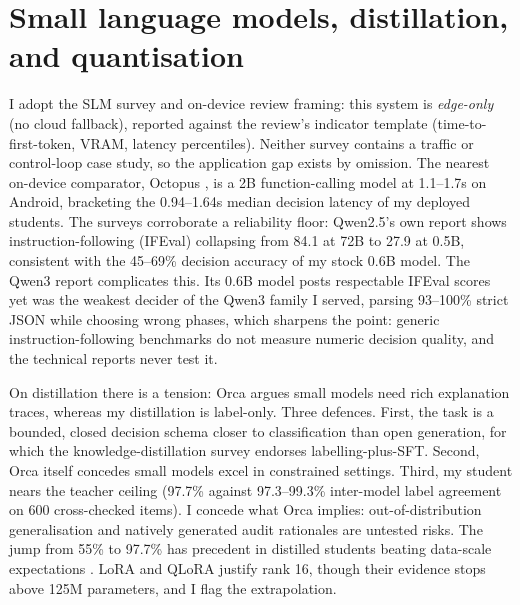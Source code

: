\section{Small language models, distillation, and quantisation}\label{sec:bg-slm}

I adopt the SLM survey \cite{slmsurvey2024} and on-device review \cite{ondevice2024} framing: this system is \emph{edge-only} (no cloud fallback), reported against the review's indicator template (time-to-first-token, VRAM, latency percentiles). Neither survey contains a traffic or control-loop case study, so the application gap exists by omission. The nearest on-device comparator, Octopus \cite{octopus2024}, is a 2B function-calling model at 1.1--1.7s on Android, bracketing the 0.94--1.64s median decision latency of my deployed students. The surveys corroborate a reliability floor: Qwen2.5's own report \cite{qwen25report} shows instruction-following (IFEval) collapsing from 84.1 at 72B to 27.9 at 0.5B, consistent with the 45--69\% decision accuracy of my stock 0.6B model. The Qwen3 report \cite{qwen3report} complicates this. Its 0.6B model posts respectable IFEval scores yet was the weakest decider of the Qwen3 family I served, parsing 93--100\% strict JSON while choosing wrong phases, which sharpens the point: generic instruction-following benchmarks do not measure numeric decision quality, and the technical reports never test it.

On distillation there is a tension: Orca \cite{mukherjee2023orca} argues small models need rich explanation traces, whereas my distillation is label-only. Three defences. First, the task is a bounded, closed decision schema closer to classification than open generation, for which the knowledge-distillation survey \cite{xu2024kdsurvey} endorses labelling-plus-SFT. Second, Orca itself concedes small models excel in constrained settings. Third, my student nears the teacher ceiling (97.7\% against 97.3--99.3\% inter-model label agreement on 600 cross-checked items). I concede what Orca implies: out-of-distribution generalisation and natively generated audit rationales are untested risks. The jump from 55\% to 97.7\% has precedent in distilled students beating data-scale expectations \cite{hsieh2023distilling,babyllama2023}. LoRA \cite{hu2021lora} and QLoRA \cite{dettmers2023qlora} justify rank 16, though their evidence stops above 125M parameters, and I flag the extrapolation.

